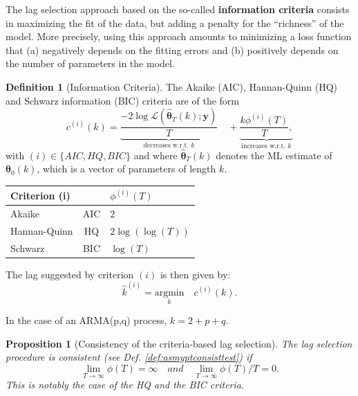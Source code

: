 \documentclass[
  12pt,
]{book}
\newtheorem{proposition}{Proposition}[chapter]
\theoremstyle{definition}
\newtheorem{definition}{Definition}[chapter]
\theoremstyle{definition}
\theoremstyle{definition}
\theoremstyle{definition}
\theoremstyle{remark}
\begin{document}
The lag selection approach based on the so-called \textbf{information criteria} consists in maximizing the fit of the data, but adding a penalty for the ``richness'' of the model. More precisely, using this approach amounts to minimizing a loss function that (a) negatively depends on the fitting errors and (b) positively depends on the number of parameters in the model.

\begin{definition}[Information Criteria]
\protect\hypertarget{def:infocriteria}{}\label{def:infocriteria}The Akaike (AIC), Hannan-Quinn (HQ) and Schwarz information (BIC) criteria are of the form
\[
c^{(i)}(k) = \underbrace{\frac{- 2 \log \mathcal{L}(\hat{\boldsymbol\theta}_T(k);\mathbf{y})}{T}}_{\mbox{decreases w.r.t. $k$}} \quad +
\underbrace{
\frac{k\phi^{(i)}(T)}{T},}_{\mbox{increases w.r.t. $k$}}
\]
with \((i) \in\{AIC,HQ,BIC\}\) and where \(\hat{\boldsymbol\theta}_T(k)\) denotes the ML estimate of \(\boldsymbol\theta_0(k)\), which is a vector of parameters of length \(k\).

\begin{center}
\begin{tabular}{lcl}
\hline
Criterion (i) && $\phi^{(i)}(T)$\\
\hline
Akaike &AIC & $2$ \\
Hannan-Quinn & HQ & $2\log(\log(T))$ \\
Schwarz &BIC & $\log(T)$ \\
\hline
\end{tabular}
\end{center}

The lag suggested by criterion \((i)\) is then given by:
\[
\boxed{\hat{k}^{(i)} = \underset{k}{\mbox{argmin}} \quad c^{(i)}(k).}
\]
\end{definition}

In the case of an ARMA(p,q) process, \(k=2+p+q\).

\begin{proposition}[Consistency of the criteria-based lag selection]
\protect\hypertarget{prp:infocriteria}{}\label{prp:infocriteria}The lag selection procedure is consistent (see Def. \ref{def:asmyptconsisttest}) if
\[
\lim_{T \rightarrow \infty} \phi(T) = \infty \quad and \quad \lim_{T \rightarrow \infty} \phi(T)/T = 0.
\]
This is notably the case of the HQ and the BIC criteria.
\end{proposition}
\end{document}

